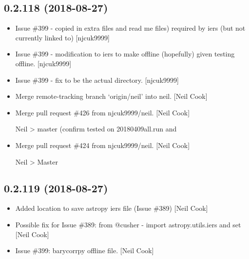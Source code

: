 \documentclass[a4paper,10pt,english]{report}
\begin{document}
\subsection{0.2.118 (2018-08-27)}
\label{\detokenize{misc/changelog:id348}}\begin{itemize}
\item {} 
Issue \#399 - copied in extra files  and read me files) required
by iers (but not currently linked to) {[}njcuk9999{]}

\item {} 
Issue \#399 - modification to iers to make offline (hopefully) given
testing offline. {[}njcuk9999{]}

\item {} 
Issue \#399 - fix  to be the actual directory.
{[}njcuk9999{]}

\item {} 
Merge remote-tracking branch ‘origin/neil’ into neil. {[}Neil Cook{]}

\item {} 
Merge pull request \#426 from njcuk9999/neil. {[}Neil Cook{]}

Neil \textendash{}\textgreater{} master (confirm tested on 20180409all.run and 

\item {} 
Merge pull request \#424 from njcuk9999/neil. {[}Neil Cook{]}

Neil \textendash{}\textgreater{} Master

\end{itemize}


\subsection{0.2.119 (2018-08-27)}
\label{\detokenize{misc/changelog:id349}}\begin{itemize}
\item {} 
Added location to save astropy iers file (Issue \#389) {[}Neil Cook{]}

\item {} 
Possible fix for Issue \#389: from @cusher - import
astropy.utils.iers and set  {[}Neil Cook{]}

\item {} 
Issue \#399: barycorrpy offline file. {[}Neil Cook{]}

\end{itemize}
\end{document}
